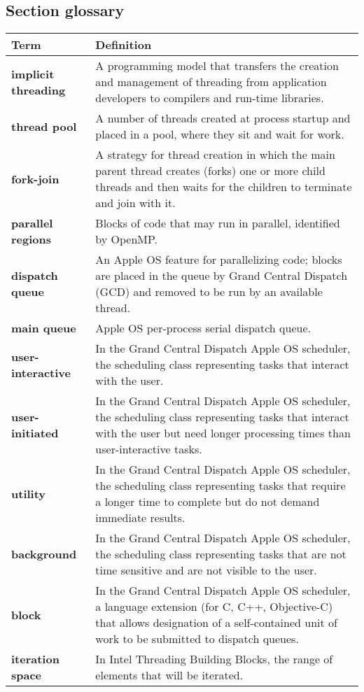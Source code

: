 \subsection*{Section glossary}
\centering
\begin{tabular}{>{\raggedright}p{} >{\raggedright\arraybackslash}p{}}
\toprule
\textbf{Term} & \textbf{Definition} \\
\midrule
\textbf{implicit threading} & A programming model that transfers the creation and management of threading from application developers to compilers and run-time libraries. \\
\textbf{thread pool} & A number of threads created at process startup and placed in a pool, where they sit and wait for work. \\
\textbf{fork-join} & A strategy for thread creation in which the main parent thread creates (forks) one or more child threads and then waits for the children to terminate and join with it. \\
\textbf{parallel regions} & Blocks of code that may run in parallel, identified by OpenMP. \\
\textbf{dispatch queue} & An Apple OS feature for parallelizing code; blocks are placed in the queue by Grand Central Dispatch (GCD) and removed to be run by an available thread. \\
\textbf{main queue} & Apple OS per-process serial dispatch queue. \\
\textbf{user-interactive} & In the Grand Central Dispatch Apple OS scheduler, the scheduling class representing tasks that interact with the user. \\
\textbf{user-initiated} & In the Grand Central Dispatch Apple OS scheduler, the scheduling class representing tasks that interact with the user but need longer processing times than user-interactive tasks. \\
\textbf{utility} & In the Grand Central Dispatch Apple OS scheduler, the scheduling class representing tasks that require a longer time to complete but do not demand immediate results. \\
\textbf{background} & In the Grand Central Dispatch Apple OS scheduler, the scheduling class representing tasks that are not time sensitive and are not visible to the user. \\
\textbf{block} & In the Grand Central Dispatch Apple OS scheduler, a language extension (for C, C++, Objective-C) that allows designation of a self-contained unit of work to be submitted to dispatch queues. \\
\textbf{iteration space} & In Intel Threading Building Blocks, the range of elements that will be iterated. \\
\bottomrule
\end{tabular}
\vspace{\baselineskip}
